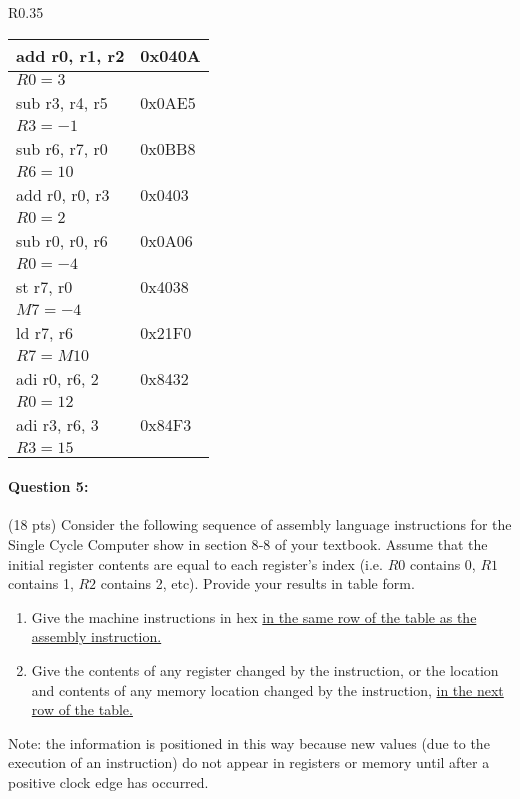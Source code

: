 \documentclass[12pt,letterpaper,titlepage]{report}
\begin{document}
\begin{raggedright}
\begin{wraptable}[23]{R}{0.35\textwidth}
\begin{tabular}{|l|l|}\hline
add r0, r1, r2 & 0x040A          \\ \hline
\multicolumn{2}{|l|}{$R0 = 3$}   \\ \hline
sub r3, r4, r5 & 0x0AE5          \\ \hline
\multicolumn{2}{|l|}{$R3 = -1$}  \\ \hline
sub r6, r7, r0 & 0x0BB8          \\ \hline
\multicolumn{2}{|l|}{$R6 = 10$}  \\ \hline
add r0, r0, r3 & 0x0403          \\ \hline
\multicolumn{2}{|l|}{$R0 = 2$}   \\ \hline
sub r0, r0, r6 & 0x0A06          \\ \hline
\multicolumn{2}{|l|}{$R0 = -4$}  \\ \hline
st r7, r0      & 0x4038          \\ \hline
\multicolumn{2}{|l|}{$M7 = -4$}  \\ \hline
ld r7, r6      & 0x21F0          \\ \hline
\multicolumn{2}{|l|}{$R7 = M10$} \\ \hline
adi r0, r6, 2  & 0x8432          \\ \hline
\multicolumn{2}{|l|}{$R0 = 12$}  \\ \hline
adi r3, r6, 3  & 0x84F3          \\ \hline
\multicolumn{2}{|l|}{$R3 = 15$}  \\ \hline
\end{tabular}
\end{wraptable}

\paragraph{Question 5:}
(18 pts) Consider the following sequence of assembly language instructions for the Single Cycle Computer show in section 8‐8 of your textbook. Assume that the initial register contents are equal to each register’s index (i.e. $R0$ contains 0, $R1$ contains 1, $R2$ contains 2, etc). Provide your results in table form.

\begin{enumerate}[nolistsep, noitemsep, label=\alph*)]
\item Give the machine instructions in hex \underline{in the same row of the table as the assembly instruction.}
\item Give the contents of any register changed by the instruction, or the location and contents of any memory location changed by the instruction, \underline{in the next row of the table.}
\end{enumerate}
Note: the information is positioned in this way because new values (due to the execution of an instruction) do not appear in registers or memory until after a positive clock edge has occurred.
\clearpage


\end{raggedright}
\end{document}

